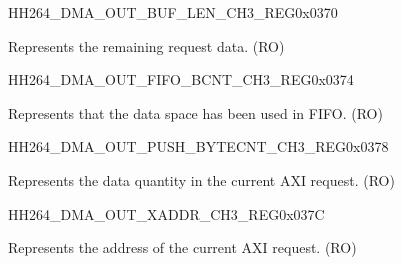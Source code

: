     \begin{register}{H}{H264\_DMA\_OUT\_BUF\_LEN\_CH3\_REG}{0x0370}\label{regdesc:H264DMAOUTBUFLENCH3REG}
    \regnewline%
    \begin{regdesc}\begin{reglist}
    \label{fielddesc:H264DMAOUTCMDFIFOBUFLENHBCH3}\item [H264\_DMA\_OUT\_CMDFIFO\_BUF\_LEN\_HB\_CH3] Represents the remaining request data. (RO)\end{reglist}\end{regdesc}
    \end{register}
    
    
    \begin{register}{H}{H264\_DMA\_OUT\_FIFO\_BCNT\_CH3\_REG}{0x0374}\label{regdesc:H264DMAOUTFIFOBCNTCH3REG}
    \regnewline%
    \begin{regdesc}\begin{reglist}
    \label{fielddesc:H264DMAOUTCMDFIFOOUTFIFOBCNTCH3}\item [H264\_DMA\_OUT\_CMDFIFO\_OUTFIFO\_BCNT\_CH3] Represents that the data space has been used in FIFO. (RO)
    \end{reglist}\end{regdesc}
    \end{register}
    
    
    \begin{register}{H}{H264\_DMA\_OUT\_PUSH\_BYTECNT\_CH3\_REG}{0x0378}\label{regdesc:H264DMAOUTPUSHBYTECNTCH3REG}
    \regnewline%
    \begin{regdesc}\begin{reglist}
    \label{fielddesc:H264DMAOUTCMDFIFOPUSHBYTECNTCH3}\item [H264\_DMA\_OUT\_CMDFIFO\_PUSH\_BYTECNT\_CH3] Represents the data quantity in the current AXI request. (RO)
    \end{reglist}\end{regdesc}
    \end{register}
    
    
    \begin{register}{H}{H264\_DMA\_OUT\_XADDR\_CH3\_REG}{0x037C}\label{regdesc:H264DMAOUTXADDRCH3REG}
    \regnewline%
    \begin{regdesc}\begin{reglist}
    \label{fielddesc:H264DMAOUTCMDFIFOXADDRCH3}\item [H264\_DMA\_OUT\_CMDFIFO\_XADDR\_CH3] Represents the address of the current AXI request. (RO)
    \end{reglist}\end{regdesc}
    \end{register}
    
